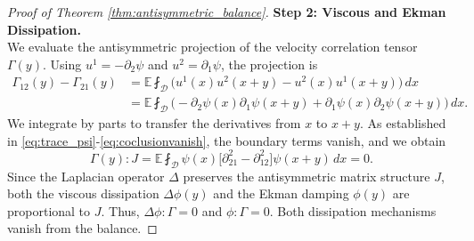 \documentclass[11pt,a4paper]{article}
\numberwithin{equation}{section}
\numberwithin{theorem}{section}
\numberwithin{remark}{section}
\numberwithin{definition}{section}
\begin{document}
\begin{proof}[Proof of Theorem \ref{thm:antisymmetric_balance}]
\noindent \textbf{Step 2: Viscous and Ekman Dissipation.}\\
We evaluate the antisymmetric projection of the velocity correlation tensor $\Gamma(y)$. Using $u^1 = -\partial_2 \psi$ and $u^2 = \partial_1 \psi$, the projection is
\begin{align*}
    \Gamma_{12}(y) - \Gamma_{21}(y) &= \mathbb{E}\fint_{\mathcal{D}} \big( u^1(x)u^2(x+y) - u^2(x)u^1(x+y) \big)\, dx \\
    &= \mathbb{E}\fint_{\mathcal{D}} \big( -\partial_2\psi(x)\partial_1\psi(x+y) + \partial_1\psi(x)\partial_2\psi(x+y) \big)\, dx.
\end{align*}
We integrate by parts to transfer the derivatives from $x$ to $x+y$. As established in \eqref{eq:trace_psi}-\eqref{eq:coclusionvanish}, the boundary terms vanish, and we obtain 
\begin{equation}
    \Gamma(y) : J = \mathbb{E}\fint_{\mathcal{D}} \psi(x) \big[ \partial_{21}^2 - \partial_{12}^2 \big] \psi(x+y) \, dx = 0.
\end{equation}
Since the Laplacian operator $\Delta$ preserves the antisymmetric matrix structure $J$, both the viscous dissipation $\Delta \phi(y)$ and the Ekman damping $\phi(y)$ are proportional to $J$. Thus, $\Delta \phi : \Gamma = 0$ and $\phi : \Gamma = 0$. Both dissipation mechanisms vanish from the balance.

\text{}


\end{proof}
\end{document}
